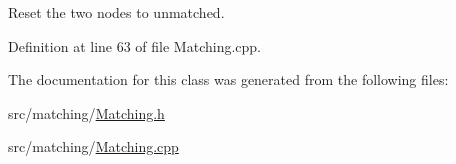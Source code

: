 Reset the two nodes to unmatched. 



Definition at line 63 of file Matching.\-cpp.



The documentation for this class was generated from the following files\-:\begin{DoxyCompactItemize}
\item 
src/matching/\hyperlink{_matching_8h}{Matching.\-h}\item 
src/matching/\hyperlink{_matching_8cpp}{Matching.\-cpp}\end{DoxyCompactItemize}
